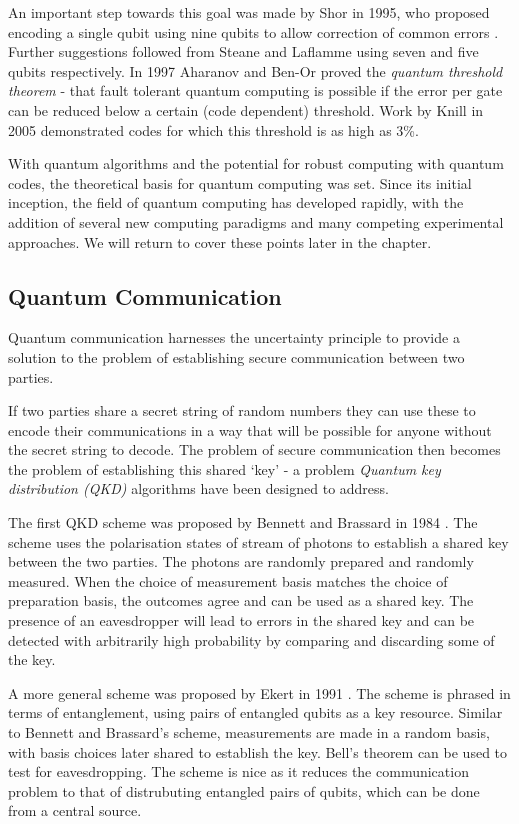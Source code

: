 An important step towards this goal was made by Shor in 1995, who proposed encoding a single qubit using nine qubits to allow correction of common errors \cite{shor_codes_95}. Further suggestions followed from Steane and Laflamme \cite{steane_code_96, steane_code_96_2, laflamme_5_code} using seven and five qubits respectively. In 1997 Aharanov and Ben-Or proved the \textit{quantum threshold theorem} - that fault tolerant quantum computing is possible if the error per gate can be reduced below a certain (code dependent) threshold. Work by Knill in 2005 \cite{knill_correction} demonstrated codes for which this threshold is as high as 3\%. 

With quantum algorithms and the potential for robust computing with quantum codes, the theoretical basis for quantum computing was set. Since its initial inception, the field of quantum computing has developed rapidly, with the addition of several new computing paradigms and many competing experimental approaches. We will return to cover these points later in the chapter.

\subsection{Quantum Communication}

Quantum communication harnesses the uncertainty principle to provide a solution to the problem of establishing secure communication between two parties.

If two parties share a secret string of random numbers they can use these to encode their communications in a way that will be possible for anyone without the secret string to decode. The problem of secure communication then becomes the problem of establishing this shared `key' - a problem \textit{Quantum key distribution (QKD)} algorithms have been designed to address.

The first QKD scheme was proposed by Bennett and Brassard in 1984 \cite{bennett_brassard_84}. The scheme uses the polarisation states of stream of photons to establish a shared key between the two parties. The photons are randomly prepared and randomly measured. When the choice of measurement basis matches the choice of preparation basis, the outcomes agree and can be used as a shared key. The presence of an eavesdropper will lead to errors in the shared key and can be detected with arbitrarily high probability by comparing and discarding some of the key.

A more general scheme was proposed by Ekert in 1991 \cite{ekert_91}. The scheme is phrased in terms of entanglement, using pairs of entangled qubits as a key resource. Similar to Bennett and Brassard's scheme, measurements are made in a random basis, with basis choices later shared to establish the key. Bell's theorem \cite{bells_theorem} can be used to test for eavesdropping. The scheme is nice as it reduces the communication problem to that of distrubuting entangled pairs of qubits, which can be done from a central source.

